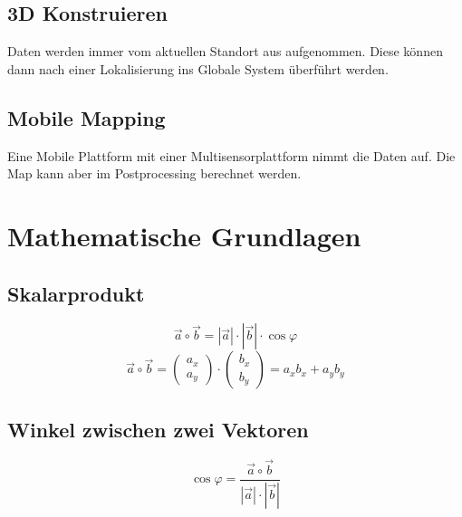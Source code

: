 \section{3D Konstruieren}
\label{einfuehrung:sec:3DKonstruieren}
	Daten werden immer vom aktuellen Standort aus aufgenommen. Diese können dann nach einer Lokalisierung ins 
	Globale System überführt werden.

\section{Mobile Mapping}
\label{einfuehrung:sec:MobileMapping}
	Eine Mobile Plattform mit einer Multisensorplattform nimmt die Daten auf. Die Map kann aber im Postprocessing berechnet werden.



\chapter{Mathematische Grundlagen}
\label{MathematischeGrundlagen}




\section{Skalarprodukt}

	\begin{equation}
		\vec{a} \circ \vec{b} = |\vec{a}| \cdot |\vec{b}| \cdot \cos\varphi 
	\end{equation}
	\begin{equation}
		\vec{a} \circ \vec{b} =
		\left(
		\begin{array}{c}
		a_{x} \\
		a_{y}
		\end{array}
		\right) 
		\cdot 
		\left(
		\begin{array}{c}
		b_{x} \\
		b_{y}
		\end{array}
		\right)
		=
		a_{x}b_{x}
		+
		a_{y}b_{y} 
	\end{equation}

\section{Winkel zwischen zwei Vektoren}
	\begin{equation}
		\cos\varphi = \frac{\vec{a} \circ \vec{b}}{|\vec{a}| \cdot |\vec{b}|}
	\end{equation}	


